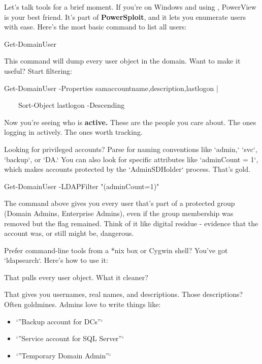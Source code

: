 Let’s talk tools for a brief moment. If you’re on Windows and using  , PowerView is your best friend. It’s part of \textbf{PowerSploit}, and it lets you enumerate users with ease. Here’s the most basic command to list all users:

Get-DomainUser

This command will dump every user object in the domain. Want to make it useful? Start filtering:

Get-DomainUser -Properties samaccountname,description,lastlogon |

    Sort-Object lastlogon -Descending

Now you’re seeing who is \textbf{active. }These are the people you care about. The ones logging in actively. The ones worth tracking.

Looking for privileged accounts? Parse for naming conventions like `admin,` `svc`, `backup`, or `DA.` You can also look for specific attributes like `adminCount = 1`, which makes accounts protected by the `AdminSDHolder` process. That’s gold.

Get-DomainUser -LDAPFilter "(adminCount=1)"

The command above gives you every user that’s part of a protected group (Domain Admins, Enterprise Admins), even if the group membership was removed but the flag remained. Think of it like digital residue - evidence that the account was, or still might be, dangerous.

Prefer command-line tools from a *nix box or Cygwin shell? You’ve got `ldapsearch`. Here’s how to use it:


That pulls every user object. What it cleaner?


That gives you usernames, real names, and descriptions. Those descriptions? Often goldmines. Admins love to write things like:

\begin{itemize}
    \item `”Backup account for DCs”`
    \item `”Service account for SQL Server”`
    \item `”Temporary Domain Admin”`
\end{itemize}

